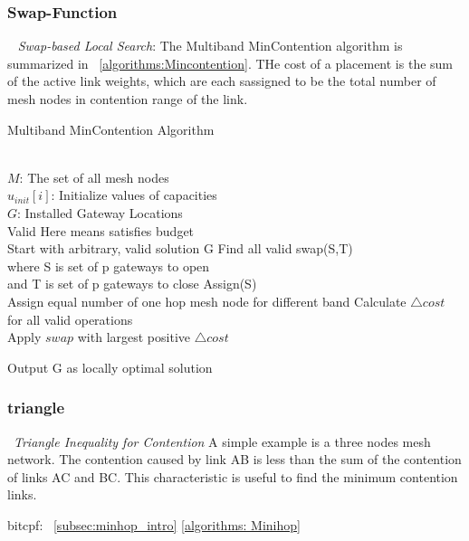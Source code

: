 \subsubsection{Swap-Function}
~\emph{ Swap-based Local Search}: The Multiband MinContention algorithm is summarized in ~\ref{algorithms:Mincontention}. THe cost of a placement is the sum of the active link weights, which are each sassigned to be the total number of mesh nodes in contention range of the link. 


	  \begin{algorithm}
          \small
	  \caption{Multiband MinContention Algorithm}
	  \label{algorithms:Mincontention}
	  \begin{algorithmic}[1]
	  \REQUIRE  ~~\\
		 $M$: The set of all mesh nodes\\
		 $u_{init}[i]$: Initialize values of capacities
\ENSURE ~~\\    
$G$: Installed Gateway Locations \\
Valid Here means satisfies budget \\
Start with arbitrary, valid solution G
\STATE Find all valid swap(S,T)\\
where S is set of p gateways to open\\
and T is set of p gateways to close
\STATE Assign(S) \\
Assign equal number of one hop mesh node for different band
\STATE Calculate $\triangle cost$ for all valid operations\\
\STATE Apply $swap$ with largest positive $\triangle cost$
\ENDWHILE 

Output G as locally optimal solution\\
\end{algorithmic}
\end{algorithm}

\subsubsection{triangle}
~\emph{Triangle Inequality for Contention} A simple example is a three nodes mesh network. The contention caused by link AB is less than the sum of the contention of links AC and BC. This characteristic is useful to find the minimum contention links.


bitcpf: ~\ref{subsec:minhop_intro}
	  \ref{algorithms: Minihop}

